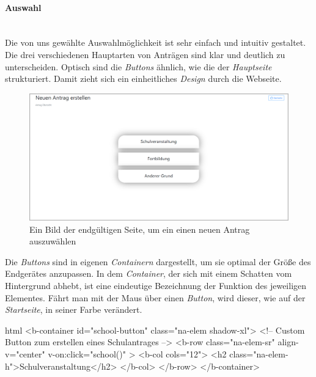 \paragraph{Auswahl}
~\\
Die von uns gewählte Auswahlmöglichkeit ist sehr einfach und intuitiv gestaltet. Die drei verschiedenen Hauptarten von Anträgen sind klar und deutlich zu unterscheiden. Optisch sind die \textit{Buttons} ähnlich, wie die der \textit{Hauptseite} strukturiert. Damit zieht sich ein einheitliches \textit{Design} durch die Webseite.
\begin{figure}[H]
	\centering
	\includegraphics[width=1\linewidth]{images/ldehner_implementierung/neu}
	\caption[Neuen Antrag erstellen Seite]{Ein Bild der endgültigen Seite, um ein einen neuen Antrag auszuwählen}
	\label{fig:neuauswahl}
\end{figure}
Die \textit{Buttons} sind in eigenen \textit{Containern} dargestellt, um sie optimal der Größe des Endgerätes anzupassen. In dem \textit{Container}, der sich mit einem Schatten vom Hintergrund abhebt, ist eine eindeutige Bezeichnung der Funktion des jeweiligen Elementes. Fährt man mit der Maus über einen \textit{Button}, wird dieser, wie auf der \textit{Startseite}, in seiner Farbe verändert.
\begin{code}{html}
	<b-container id="school-button" class="na-elem shadow-xl">
	<!-- Custom Button zum erstellen eines Schulantrages -->
	<b-row
	  class="na-elem-sr"
	  align-v="center"
	  v-on:click="school()"
	>
	  <b-col cols="12">
		<h2 class="na-elem-h">Schulveranstaltung</h2>
	  </b-col>
	</b-row>
  </b-container>	
\end{code}
	\label{list:htmlselect} ~\\
